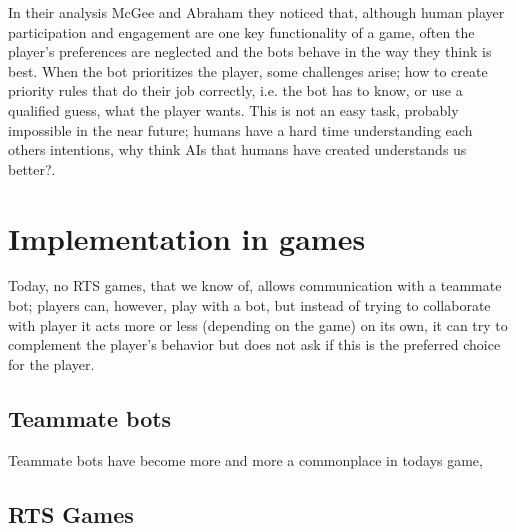 In their analysis\cite{mcgee10} McGee and Abraham they noticed that, although human player participation and engagement are one key functionality of a game\cite{reynolds03}, often the player's preferences are neglected and the bots behave in the way they think is best. When the bot prioritizes the player, some challenges arise; how to create priority rules that do their job correctly\cite{mcgee10}, i.e. the bot has to know, or use a qualified guess, what the player wants. This is not an easy task, probably impossible in the near future; humans have a hard time understanding each others intentions, why think AIs that humans have created understands us better\cite{norman07}?.

\section{Implementation in games}


Today, no RTS games, that we know of, allows communication with a teammate bot; players can, however, play with a bot, but instead of trying to collaborate with player it acts more or less (depending on the game) on its own, it can try to complement the player's behavior but does not ask if this is the preferred choice for the player.


\subsection{Teammate bots}
Teammate bots have become more and more a commonplace in todays game, 

\subsection{RTS Games}